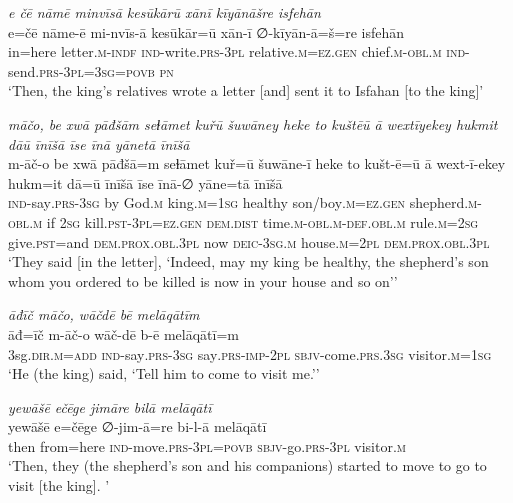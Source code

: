 \ea \label{KŠ.50}
\textit{e čē nāmē minvīsā kesūkārū xānī kīyānāšre isfehān} \\ 
\gll e=čē nāme-ē mi-nvīs-ā kesūkār=ū xān-ī ∅-kīyān-ā=š=re isfehān \\ 
 in=here letter\textsc{.m}\textsc{-indf} \textsc{ind-}write\textsc{.prs}\textsc{-3pl} relative\textsc{.m}\textsc{=ez.gen} chief\textsc{.m}\textsc{-obl}\textsc{.m} \textsc{ind-}send\textsc{.prs}\textsc{-3pl}\textsc{=3sg}\textsc{=\textsc{povb}} \textsc{pn} \\ 
\glt `Then, the king’s relatives wrote a letter [and] sent it to Isfahan [to the king]'
\z 
 
\ea \label{KŠ.51}
\textit{māčo, be xwā pāđšām seɫāmet kuřū šuwāney heke to kuštēū ā wextīyekey hukmit dāū īnīšā īse īnā yānetā īnīšā} \\ 
\gll m-āč-o be xwā pāđšā=m seɫāmet kuř=ū šuwāne-ī heke to kušt-ē=ū ā wext-ī-ekey hukm=it dā=ū īnīšā īse īnā-∅ yāne=tā īnīšā \\ 
 \textsc{ind-}say\textsc{.prs}\textsc{-3sg} by God\textsc{.m} king\textsc{.m}\textsc{=\textsc{1sg}} healthy son/boy\textsc{.m}\textsc{=ez.gen} shepherd\textsc{.m}\textsc{-obl}\textsc{.m} if \textsc{2sg} kill\textsc{.pst}\textsc{-3pl}\textsc{=ez.gen} \textsc{dem.dist} time\textsc{.m}\textsc{-obl}\textsc{.m}\textsc{-def}\textsc{.obl}\textsc{.m} rule\textsc{.m}\textsc{=\textsc{2sg}} give\textsc{.pst}=and \textsc{dem.prox}\textsc{.obl}\textsc{.3pl} now \textsc{deic}\textsc{-3sg}\textsc{.m} house\textsc{.m}=\textsc{2pl} \textsc{dem.prox}\textsc{.obl}\textsc{.3pl} \\ 
\glt `They said [in the letter], ‘Indeed, may my king be healthy, the shepherd’s son whom you ordered to be killed is now in your house and so on’'
\z 
 
\ea \label{KŠ.52}
\textit{āđīč māčo, wāčdē bē melāqātīm} \\ 
\gll āđ=īč m-āč-o wāč-dē b-ē melāqātī=m \\ 
 3sg\textsc{.dir}\textsc{.m}\textsc{=add} \textsc{ind-}say\textsc{.prs}\textsc{-3sg} say\textsc{.prs}-\textsc{imp-}\textsc{2pl} \textsc{sbjv-}come\textsc{.prs}\textsc{.3sg} visitor\textsc{.m}\textsc{=\textsc{1sg}} \\ 
\glt `He (the king) said, ‘Tell him to come to visit me.’'
\z 
 
\ea \label{KŠ.53}
\textit{yewāšē ečēge jimāre bilā melāqātī} \\ 
\gll yewāšē e=čēge ∅-jim-ā=re bi-l-ā melāqātī \\ 
 then from=here \textsc{ind-}move\textsc{.prs}\textsc{-3pl}\textsc{=\textsc{povb}} \textsc{sbjv-}go\textsc{.prs}\textsc{-3pl} visitor\textsc{.m} \\ 
\glt `Then, they (the shepherd's son and his companions) started to move to go to visit [the king]. '
\z 
 
